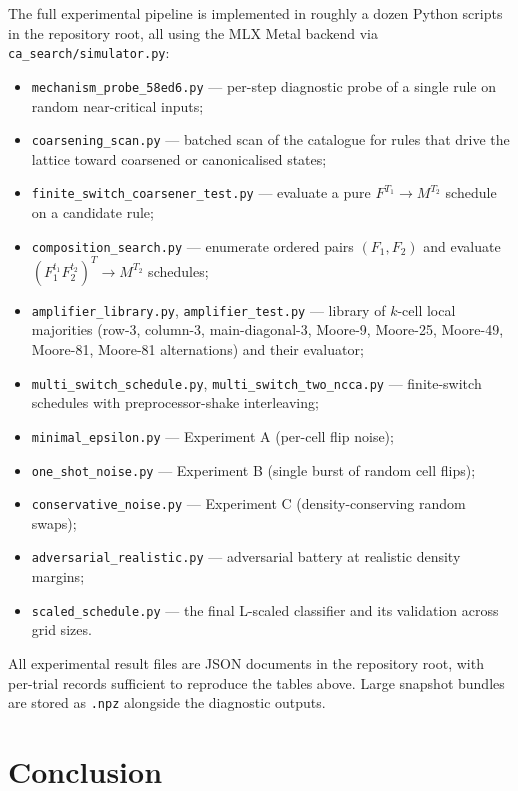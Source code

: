 \documentclass[11pt,a4paper]{article}
\begin{document}
The full experimental pipeline is implemented in roughly a dozen Python
scripts in the repository root, all using the MLX Metal backend via
\texttt{ca\_search/simulator.py}:
\begin{itemize}
\item \texttt{mechanism\_probe\_58ed6.py} --- per-step diagnostic probe of a
single rule on random near-critical inputs;
\item \texttt{coarsening\_scan.py} --- batched scan of the catalogue for
rules that drive the lattice toward coarsened or canonicalised states;
\item \texttt{finite\_switch\_coarsener\_test.py} --- evaluate a pure
\(F^{T_1}\to M^{T_2}\) schedule on a candidate rule;
\item \texttt{composition\_search.py} --- enumerate ordered pairs
\((F_1, F_2)\) and evaluate \((F_1^{t_1} F_2^{t_2})^T \to M^{T_2}\)
schedules;
\item \texttt{amplifier\_library.py}, \texttt{amplifier\_test.py} --- library
of \(k\)-cell local majorities (row-3, column-3, main-diagonal-3, Moore-9,
Moore-25, Moore-49, Moore-81, Moore-81 alternations) and their evaluator;
\item \texttt{multi\_switch\_schedule.py},
\texttt{multi\_switch\_two\_ncca.py} --- finite-switch schedules with
preprocessor-shake interleaving;
\item \texttt{minimal\_epsilon.py} --- Experiment A (per-cell flip noise);
\item \texttt{one\_shot\_noise.py} --- Experiment B (single burst of random
cell flips);
\item \texttt{conservative\_noise.py} --- Experiment C (density-conserving
random swaps);
\item \texttt{adversarial\_realistic.py} --- adversarial battery at
realistic density margins;
\item \texttt{scaled\_schedule.py} --- the final L-scaled classifier and its
validation across grid sizes.
\end{itemize}

All experimental result files are JSON documents in the repository root,
with per-trial records sufficient to reproduce the tables above.  Large
snapshot bundles are stored as \texttt{.npz} alongside the diagnostic
outputs.

\section{Conclusion}
\end{document}
